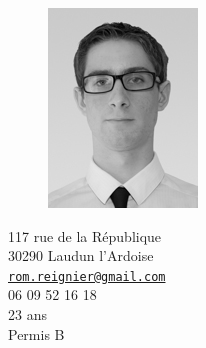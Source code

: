 \documentclass[a4paper,11pt,final]{memoir}
\begin{document}
\begin{figure}
	\hfill
	\includegraphics[width=0.5\columnwidth]{../IMG_7936-Modifier_cv}
	\vspace{-0.5cm}
\end{figure}

\begin{flushright}\small
	117 rue de la République\\
	30290 Laudun l'Ardoise\\
	{\href{mailto:rom.reignier@gmail.com}{\nolinkurl{rom.reignier@gmail.com}}}\\
	06 09 52 16 18\\
	23 ans\\
	Permis B
\end{flushright}%
\end{document}
